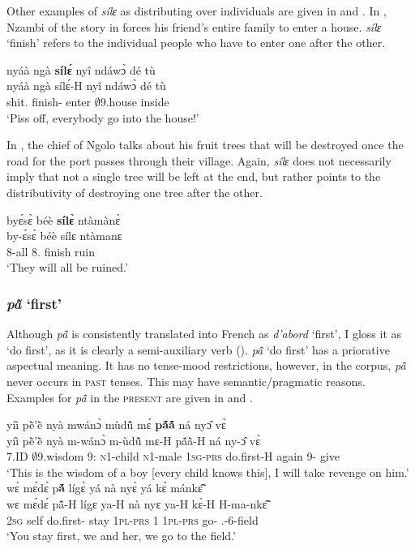Other examples of {\itshape sílɛ} as distributing over individuals are given in  and . In , Nzambi of the story in  forces his friend's entire family  to enter a house. {\itshape sílɛ} `finish' refers to the individual people who have to enter one after the other.

\ea\label{sile4}
  \glll nyáà ngà {\bfseries sílɛ́} nyî ndáwɔ̀ dé tù \\
       nyáà ngà sílɛ́-H nyî ndáwɔ̀ dé tù \\
       shit.{\IMP} {\PL} finish-{\R} enter $\emptyset$9.house {\LOC} inside\\
    \trans `Piss off, everybody go into the house!'
\z

\noindent In , the chief of Ngolo talks about his fruit trees that will be destroyed once the road for the port passes through their village. Again, {\itshape sílɛ} does not necessarily imply that not a single tree will be left at the end, but rather points to the distributivity of destroying one tree after the other.

\ea\label{sile5}
  \glll   byɛ́sɛ̀ béè {\bfseries sílɛ̀} ntàmànɛ̀\\
      by-ɛ́sɛ̀ béè sílɛ ntàmanɛ \\
           8-all 8.{\FUT} finish ruin\\
    \trans `They will all be ruined.'
\z







\subsubsection*{{\itshape pã̂} `first'}
Although {\itshape pã̂} is consistently translated into French as {\itshape d'abord} `first', I gloss it as `do first', as it is clearly a semi-auxiliary verb (). {\itshape pã̂} `do first' has a priorative aspectual meaning. It has no tense-mood restrictions, however, in the corpus, {\itshape pã̂} never occurs in \textsc{past} tenses.  This may have semantic/pragmatic reasons. Examples for {\itshape pã̂} in the \textsc{present} are given in  and .

\ea\label{pa1}
  \glll yíì pẽ̀'ẽ̀ nyà mwánɔ̀ mùdũ̂ mɛ́ {\bfseries pã́ã́} ná nyɔ̂ vɛ̀\\
       yíì pẽ̀'ẽ̀ nyà m-wánɔ̀ m-ùdũ̂ mɛ-H pã́ã̀-H ná ny-ɔ̂ vɛ̀ \\
      7.ID $\emptyset$9.wisdom 9:{\ATT} \textsc{n}1-child \textsc{n}1-male  1\textsc{sg}-\textsc{prs} do.first-H again 9-{\OBJ} give\\
    \trans `This is the wisdom of a boy [every child knows this], I will take revenge on him.'
\ex\label{pan1}
  \glll   wɛ̀ mɛ́dɛ́ p{\bfseries ã́} lígɛ̀ yá nà nyɛ̀ yá kɛ́ mánkɛ̃̂  \\
         wɛ mɛ́dɛ́ pã̂-H lígɛ ya-H nà nyɛ ya-H kɛ̀-H H-ma-nkɛ̃̂  \\
           2\textsc{sg} self do.first-{\R} stay 1\textsc{pl}-\textsc{prs} {\COM} 1  1\textsc{pl}-\textsc{prs} go-{\R} {\OBJ}.{\LINK}-6-field\\
    \trans `You stay first, we and her, we go to the field.'
\z

